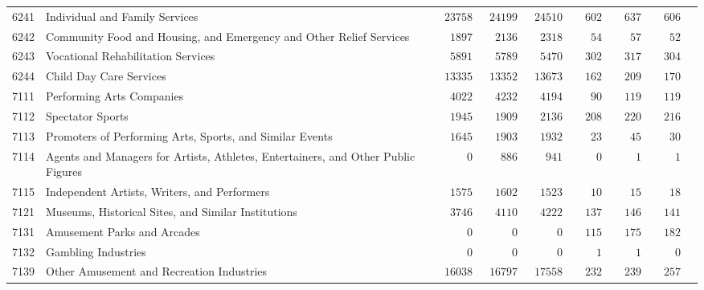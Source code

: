 \documentclass[9pt, oneside]{article}   	%
\begin{document}
\begin{longtable}{lp{3 in}ccccccc}
6241  & Individual and Family Services & $\phantom{0}23758$ & $\phantom{0}24199$ & $\phantom{0}24510$ & $\phantom{00}602$ & $\phantom{00}637$ & $\phantom{00}606$ \\
6242  & Community Food and Housing, and Emergency and Other Relief Services & $\phantom{00}1897$ & $\phantom{00}2136$ & $\phantom{00}2318$ & $\phantom{000}54$ & $\phantom{000}57$ & $\phantom{000}52$ \\
6243  & Vocational Rehabilitation Services & $\phantom{00}5891$ & $\phantom{00}5789$ & $\phantom{00}5470$ & $\phantom{00}302$ & $\phantom{00}317$ & $\phantom{00}304$ \\
6244  & Child Day Care Services & $\phantom{0}13335$ & $\phantom{0}13352$ & $\phantom{0}13673$ & $\phantom{00}162$ & $\phantom{00}209$ & $\phantom{00}170$ \\
7111  & Performing Arts Companies & $\phantom{00}4022$ & $\phantom{00}4232$ & $\phantom{00}4194$ & $\phantom{000}90$ & $\phantom{00}119$ & $\phantom{00}119$ \\
7112  & Spectator Sports & $\phantom{00}1945$ & $\phantom{00}1909$ & $\phantom{00}2136$ & $\phantom{00}208$ & $\phantom{00}220$ & $\phantom{00}216$ \\
7113  & Promoters of Performing Arts, Sports, and Similar Events & $\phantom{00}1645$ & $\phantom{00}1903$ & $\phantom{00}1932$ & $\phantom{000}23$ & $\phantom{000}45$ & $\phantom{000}30$ \\
7114  & Agents and Managers for Artists, Athletes, Entertainers, and Other Public Figures & $\phantom{00000}0$ & $\phantom{000}886$ & $\phantom{000}941$ & $\phantom{0000}0$ & $\phantom{0000}1$ & $\phantom{0000}1$ \\
7115  & Independent Artists, Writers, and Performers & $\phantom{00}1575$ & $\phantom{00}1602$ & $\phantom{00}1523$ & $\phantom{000}10$ & $\phantom{000}15$ & $\phantom{000}18$ \\
7121  & Museums, Historical Sites, and Similar Institutions & $\phantom{00}3746$ & $\phantom{00}4110$ & $\phantom{00}4222$ & $\phantom{00}137$ & $\phantom{00}146$ & $\phantom{00}141$ \\
7131  & Amusement Parks and Arcades & $\phantom{00000}0$ & $\phantom{00000}0$ & $\phantom{00000}0$ & $\phantom{00}115$ & $\phantom{00}175$ & $\phantom{00}182$ \\
7132  & Gambling Industries & $\phantom{00000}0$ & $\phantom{00000}0$ & $\phantom{00000}0$ & $\phantom{0000}1$ & $\phantom{0000}1$ & $\phantom{0000}0$ \\
7139  & Other Amusement and Recreation Industries & $\phantom{0}16038$ & $\phantom{0}16797$ & $\phantom{0}17558$ & $\phantom{00}232$ & $\phantom{00}239$ & $\phantom{00}257$ \\

\end{longtable}
\end{document}
